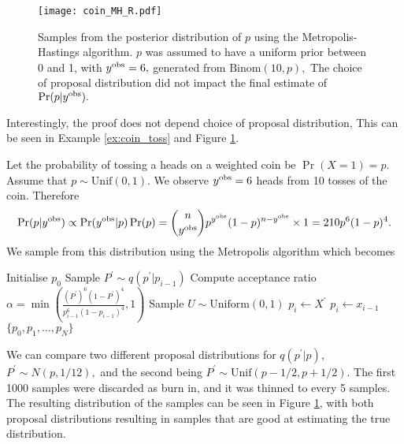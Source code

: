 \begin{figure}[htbp]
    \centering
    \texttt{[image: coin\_MH\_R.pdf]}
    \caption{
        Samples from the posterior distribution of $p$ using the
        Metropolis-Hastings algorithm. $p$ was assumed to
        have a uniform prior between 0 and 1, with $y^{\mathrm{obs}} = 6,$ generated
        from $\mathrm{Binom}(10, p),$
        The choice of proposal distribution did not impact the final estimate
        of $\Pr(p | y^{\mathrm{obs}}).$
    }
    \label{fig:coin_R}
\end{figure}

Interestingly, the proof does not depend choice of proposal distribution,
This can be seen in Example \ref{ex:coin_toss} and Figure \ref{fig:coin_R}.

\begin{example}\label{ex:coin_toss}
    Let the probability of tossing a heads on a weighted coin be
    $\Pr(X = 1) = p.$ Assume that $p\sim \mathrm{Unif}(0,1).$
    We observe $y^{\mathrm{obs}} = 6$ heads from 10 tosses of the coin.
    Therefore
    $$
        \Pr(p | y^{\mathrm{obs}}) \propto \Pr(y^{\mathrm{obs}}| p)\Pr(p)
        = \binom{n}{y^{\mathrm{obs}}}p^{y^{\mathrm{obs}}}(1 - p)^{n - y^{\mathrm{obs}}}\times 1
        = 210p^6(1-p)^4.
    $$
    We sample from this distribution using the Metropolis algorithm which
    becomes
    \begin{algorithmic}
        \State Initialise $p_0$
        \State Sample $P^\prime \sim q(p^\prime|p_{i - 1})$
        \State Compute acceptance ratio
        $\alpha
            = \min\left(
            \frac{(P^\prime)^6(1-P^\prime)^4}{p_{i - 1}^6(1-p_{i - 1})^4}, 1
            \right)$ 
        \State Sample $U \sim \text{Uniform}(0, 1)$
        \State $p_i \gets X^\prime$
        \Else
        \State $p_i \gets x_{i - 1}$
        \EndIf
        \EndFor
        \State \Return $\{p_0, p_1, \dots, p_N\}$
    \end{algorithmic}

    We can compare two
    different proposal distributions for $q(p^\prime | p)$,
    $P^\prime \sim N(p, 1/12),$ and
    the second being $P^\prime \sim \mathrm{Unif}(p - 1/2, p + 1/2).$ The first
    1000 samples were discarded as burn in, and it was thinned to every 5
    samples.
    The resulting distribution of the samples can be seen in Figure
    \ref{fig:coin_R}, with both proposal distributions resulting in samples
    that are good at estimating the true distribution.
\end{example}

